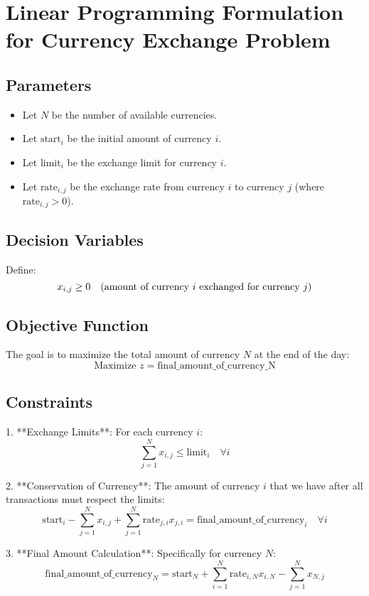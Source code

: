 \documentclass{article}
\begin{document}
\section*{Linear Programming Formulation for Currency Exchange Problem}

\subsection*{Parameters}
\begin{itemize}
    \item Let \( N \) be the number of available currencies.
    \item Let \( \text{start}_i \) be the initial amount of currency \( i \).
    \item Let \( \text{limit}_i \) be the exchange limit for currency \( i \).
    \item Let \( \text{rate}_{i,j} \) be the exchange rate from currency \( i \) to currency \( j \) (where \( \text{rate}_{i,j} > 0 \)).
\end{itemize}

\subsection*{Decision Variables}
Define:
\[
x_{i,j} \geq 0 \quad \text{(amount of currency \( i \) exchanged for currency \( j \))}
\]

\subsection*{Objective Function}
The goal is to maximize the total amount of currency \( N \) at the end of the day:
\[
\text{Maximize } z = \text{final\_amount\_of\_currency\_N}
\]

\subsection*{Constraints}

1. **Exchange Limits**:
   For each currency \( i \):
   \[
   \sum_{j=1}^{N} x_{i,j} \leq \text{limit}_i \quad \forall i
   \]

2. **Conservation of Currency**:
   The amount of currency \( i \) that we have after all transactions must respect the limits:
   \[
   \text{start}_i - \sum_{j=1}^{N} x_{i,j} + \sum_{j=1}^{N} \text{rate}_{j,i} x_{j,i} = \text{final\_amount\_of\_currency}_i \quad \forall i
   \]

3. **Final Amount Calculation**:
   Specifically for currency \( N \):
   \[
   \text{final\_amount\_of\_currency}_N = \text{start}_N + \sum_{i=1}^{N} \text{rate}_{i,N} x_{i,N} - \sum_{j=1}^{N} x_{N,j}
   \]
\end{document}
